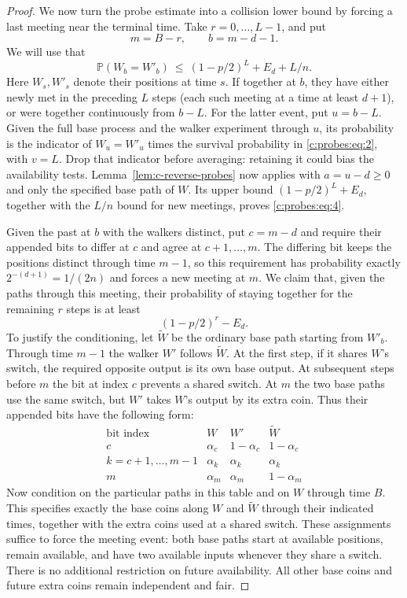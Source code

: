 \begin{proof}
We now turn the probe estimate into a collision lower bound by forcing a last meeting near the
terminal time. Take \(r=0,\ldots,L-1\), and put
\[
m=B-r,\qquad b=m-d-1.
\]
We will use that
\begin{equation}
\mathbb P(W_b=W'_b)\ \le\ (1-p/2)^L+E_d+ L/n.                     \label{c:probes:eq:4}
\end{equation}
Here \(W_s,W'_s\) denote their positions at time \(s\). If together at \(b\), they have either
newly met in the preceding \(L\) steps (each such meeting at a time at least \(d+1\)), or were
together continuously from \(b-L\). For the latter event, put
$u=b-L$. Given the full base process and the walker experiment through
$u$, its probability is the indicator of $W_u=W'_u$ times the
survival probability in \eqref{c:probes:eq:2}, with $v=L$.
Drop that indicator before averaging: retaining it could bias the
availability tests. Lemma~\ref{lem:c-reverse-probes} now applies with
$a=u-d\ge0$ and only the specified base path of $W$. Its upper bound
$(1-p/2)^L+E_d$, together with the $L/n$ bound for new meetings, proves
\eqref{c:probes:eq:4}.

\label{c:probes:p015}

Given the past at $b$ with the walkers distinct, put $c=m-d$ and
require their appended bits to differ at $c$ and agree at
$c+1,\ldots,m$. The differing bit keeps the positions distinct through
time $m-1$, so this requirement has probability exactly
$2^{-(d+1)}=1/(2n)$ and forces a new meeting at $m$. We claim that,
given the paths through this meeting, their probability of staying
together for the remaining $r$ steps is at least
\begin{equation}
(1-p/2)^r-E_d.                                                     \label{c:probes:eq:5}
\end{equation}
To justify the conditioning, let $\widetilde W$ be the ordinary base
path starting from $W'_b$. Through time $m-1$ the walker $W'$ follows
$\widetilde W$. At the first step, if it shares $W$'s switch, the
required opposite output is its own base output. At subsequent steps
before $m$ the bit at index $c$ prevents a shared switch. At $m$ the
two base paths use the same switch, but $W'$ takes $W$'s output by its
extra coin. Thus their appended bits have the following form:
\[
\begin{array}{c|ccc}
\text{bit index}&W&W'&\widetilde W\\ \hline
c&\alpha_c&1-\alpha_c&1-\alpha_c\\
k=c+1,\ldots,m-1&\alpha_k&\alpha_k&\alpha_k\\
m&\alpha_m&\alpha_m&1-\alpha_m
\end{array}
\]
Now condition on the particular paths in this table and on $W$ through
time $B$. This specifies exactly the base coins along $W$ and
$\widetilde W$ through their indicated times, together with the extra
coins used at a shared switch. These assignments suffice to force the
meeting event: both base paths start at available positions, remain
available, and have two available inputs whenever they share a switch.
There is no additional restriction on future availability. All other
base coins and future extra coins remain independent and fair.


\end{proof}
